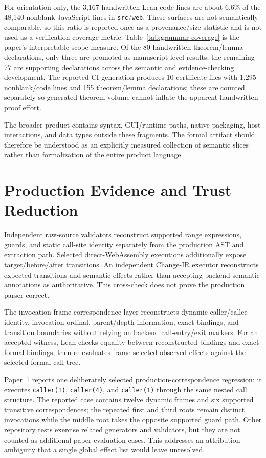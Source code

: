 \documentclass[10pt]{article}
\theoremstyle{plain}
\theoremstyle{remark}
\begin{document}
For orientation only, the 3,167 handwritten Lean code lines are about 6.6\% of the 48,140 nonblank JavaScript lines in \texttt{src}/\texttt{web}. These surfaces are not semantically comparable, so this ratio is reported once as a provenance/size statistic and is not used as a verification-coverage metric. Table~\ref{tab:grammar-coverage} is the paper's interpretable scope measure. Of the 80 handwritten theorem/lemma declarations, only three are promoted as manuscript-level results; the remaining 77 are supporting declarations across the semantic and evidence-checking development. The reported CI generation produces 10 certificate files with 1,295 nonblank/code lines and 155 theorem/lemma declarations; these are counted separately so generated theorem volume cannot inflate the apparent handwritten proof effort.

The broader product contains syntax, GUI/runtime paths, native packaging, host interactions, and data types outside these fragments. The formal artifact should therefore be understood as an explicitly measured collection of semantic slices rather than formalization of the entire product language.

\section{Production Evidence and Trust Reduction}
Independent raw-source validators reconstruct supported range expressions, guards, and static call-site identity separately from the production AST and extraction path. Selected direct-WebAssembly executions additionally expose target/before/after transitions. An independent Change-IR executor reconstructs expected transitions and semantic effects rather than accepting backend semantic annotations as authoritative. This cross-check does not prove the production parser correct.

The invocation-frame correspondence layer reconstructs dynamic caller/callee identity, invocation ordinal, parent/depth information, exact bindings, and transition boundaries without relying on backend call-entry/exit markers. For an accepted witness, Lean checks equality between reconstructed bindings and exact formal bindings, then re-evaluates frame-selected observed effects against the selected formal call tree.

Paper~1 reports one deliberately selected production-correspondence regression: it executes \texttt{caller(1)}, \texttt{caller(4)}, and \texttt{caller(1)} through the same nested call structure. The reported case contains twelve dynamic frames and six supported transitive correspondences; the repeated first and third roots remain distinct invocations while the middle root takes the opposite supported guard path. Other repository tests exercise related generators and validators, but they are not counted as additional paper evaluation cases. This addresses an attribution ambiguity that a single global effect list would leave unresolved.
\end{document}
